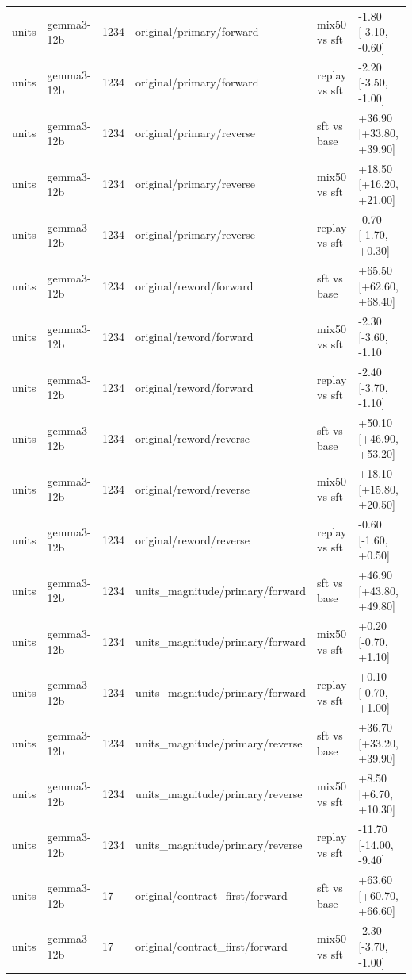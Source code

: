 \begin{table}[t]
\begin{tabular}{llllll}
units & gemma3-12b & 1234 & original/primary/forward & mix50 vs sft & -1.80 [-3.10, -0.60] \\
units & gemma3-12b & 1234 & original/primary/forward & replay vs sft & -2.20 [-3.50, -1.00] \\
units & gemma3-12b & 1234 & original/primary/reverse & sft vs base & +36.90 [+33.80, +39.90] \\
units & gemma3-12b & 1234 & original/primary/reverse & mix50 vs sft & +18.50 [+16.20, +21.00] \\
units & gemma3-12b & 1234 & original/primary/reverse & replay vs sft & -0.70 [-1.70, +0.30] \\
units & gemma3-12b & 1234 & original/reword/forward & sft vs base & +65.50 [+62.60, +68.40] \\
units & gemma3-12b & 1234 & original/reword/forward & mix50 vs sft & -2.30 [-3.60, -1.10] \\
units & gemma3-12b & 1234 & original/reword/forward & replay vs sft & -2.40 [-3.70, -1.10] \\
units & gemma3-12b & 1234 & original/reword/reverse & sft vs base & +50.10 [+46.90, +53.20] \\
units & gemma3-12b & 1234 & original/reword/reverse & mix50 vs sft & +18.10 [+15.80, +20.50] \\
units & gemma3-12b & 1234 & original/reword/reverse & replay vs sft & -0.60 [-1.60, +0.50] \\
units & gemma3-12b & 1234 & units\_magnitude/primary/forward & sft vs base & +46.90 [+43.80, +49.80] \\
units & gemma3-12b & 1234 & units\_magnitude/primary/forward & mix50 vs sft & +0.20 [-0.70, +1.10] \\
units & gemma3-12b & 1234 & units\_magnitude/primary/forward & replay vs sft & +0.10 [-0.70, +1.00] \\
units & gemma3-12b & 1234 & units\_magnitude/primary/reverse & sft vs base & +36.70 [+33.20, +39.90] \\
units & gemma3-12b & 1234 & units\_magnitude/primary/reverse & mix50 vs sft & +8.50 [+6.70, +10.30] \\
units & gemma3-12b & 1234 & units\_magnitude/primary/reverse & replay vs sft & -11.70 [-14.00, -9.40] \\
units & gemma3-12b & 17 & original/contract\_first/forward & sft vs base & +63.60 [+60.70, +66.60] \\
units & gemma3-12b & 17 & original/contract\_first/forward & mix50 vs sft & -2.30 [-3.70, -1.00] \\

\end{tabular}
\end{table}
